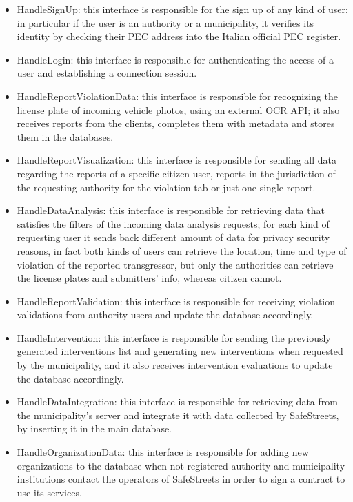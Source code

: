 \begin{itemize}
	\item HandleSignUp: this interface is responsible for the sign up of any kind of user; in particular if the user is an authority or a municipality, it verifies its identity by checking their PEC address into the Italian official PEC register.
	\item HandleLogin: this interface is responsible for authenticating the access of a user and establishing a connection session.
	\item HandleReportViolationData: this interface is responsible for recognizing the license plate of incoming vehicle photos, using an external OCR API; it also receives reports from the clients, completes them with metadata and stores them in the databases.
	\item HandleReportVisualization: this interface is responsible for sending all data regarding the reports of a specific citizen user, reports in the jurisdiction of the requesting authority for the violation tab or just one single report.
	\item HandleDataAnalysis: this interface is responsible for retrieving data that satisfies the filters of the incoming data analysis requests; for each kind of requesting user it sends back different amount of data for privacy security reasons, in fact both kinds of users can retrieve the location, time and type of violation of the reported transgressor, but only the authorities can retrieve the license plates and submitters' info, whereas citizen cannot.
	\item HandleReportValidation: this interface is responsible for receiving violation validations from authority users and update the database accordingly.
	\item HandleIntervention: this interface is responsible for sending the previously generated interventions list and generating new interventions when requested by the municipality, and it also receives intervention evaluations to update the database accordingly.
	\item HandleDataIntegration: this interface is responsible for retrieving data from the municipality's server and integrate it with data collected by SafeStreets, by inserting it in the main database.
	\item HandleOrganizationData: this interface is responsible for adding new organizations to the database when not registered authority and municipality institutions contact the operators of SafeStreets in order to sign a contract to use its services.
\end{itemize}